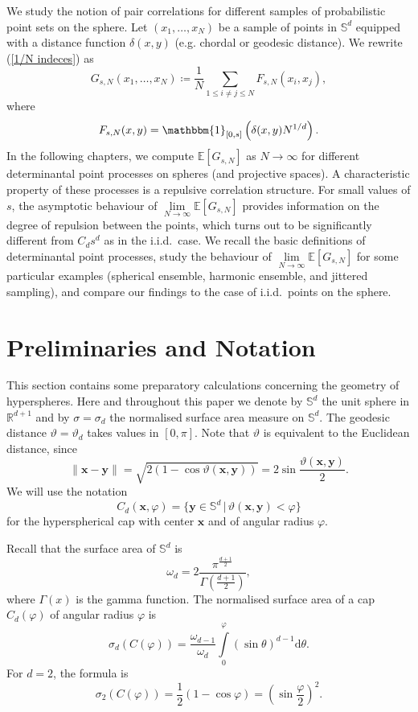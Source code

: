 \documentclass[a4paper,11pt]{amsart}
\begin{document}
We study the notion of pair correlations for different samples of probabilistic point sets on the sphere.  Let  $(x_1, \dots , x_N)$ be a sample of points in $\mathbb{S}^d$ equipped with a distance function $\delta(x,y)$ (e.g. chordal or geodesic distance). We rewrite (\ref{1/N indeces}) as
$$G_{s,N}(x_1,\dots,x_N)\coloneqq\frac{1}{N}\sum\limits_{1\leq i\neq j \leq N}F_{s,N}(x_i,x_j),$$
where 
$$F_{s,N}(x,y)=\mathbbm{1}_{[0,s]}\left(\delta(x,y)N^{1/d}\right).$$
In the following chapters, we compute  $\mathbb{E}\left[G_{s,N}\right]$ as $N\rightarrow\infty$ for different determinantal point processes on spheres (and projective spaces). A characteristic property of these processes is a repulsive correlation structure. For small values of $s$, the asymptotic behaviour of $\lim\limits_{N\rightarrow\infty}\mathbb{E}\left[G_{s,N}\right]$ provides information on the degree of repulsion between the points, which turns out to be significantly different from $C_ds^d$ as in the i.i.d.\ case. We recall the basic definitions of determinantal point processes, study the behaviour of $\lim\limits_{N\rightarrow\infty}\mathbb{E}\left[G_{s,N}\right]$ for some particular examples (spherical ensemble, harmonic ensemble, and jittered sampling), and compare our findings to the case of i.i.d.\ points on the sphere.






\section{Preliminaries and Notation}

This section contains some preparatory calculations concerning the geometry of hyperspheres. Here and throughout this paper we denote by $\mathbb{S}^d$ the unit sphere in $\mathbb{R}^{d+1}$ and by $\sigma =\sigma_d$ the normalised surface area measure on $\mathbb{S}^d$. The geodesic distance $\vartheta=\vartheta_d$ takes values in $[0,\pi]$. Note that $\vartheta$ is equivalent to the Euclidean distance, since
$$\|\mathbf{x}-\mathbf{y}\|=\sqrt{2(1-\cos\vartheta(\mathbf{x},\mathbf{y}))}=2\sin\frac{\vartheta(\mathbf{x},\mathbf{y})}{2}.$$ We will use the notation
$$C_d(\mathbf{x},\varphi)=\{\mathbf{y}\in\mathbb{S}^d\, |\, \vartheta(\mathbf{x},\mathbf{y})<\varphi\}$$
for the hyperspherical cap with center $\mathbf{x}$ and of angular radius $\varphi$. 

Recall that the surface area of $\mathbb{S}^d$ is $$\omega_d=2\frac{\pi^{\frac{d+1}{2}}}{\Gamma\left(\frac{d+1}{2}\right)},$$ 
where $\Gamma(x)$ is the gamma function. The normalised surface area of a cap $C_d(\varphi)$ of angular radius $\varphi$ is
$$\sigma_d(C(\varphi))=\frac{\omega_{d-1}}{\omega_d}\int\limits_{0}^\varphi(\sin\theta)^{d-1} \mathrm{d}\theta.$$ 
For $d=2$, the formula is 
$$\sigma_2(C(\varphi))=\frac{1}{2}(1-\cos\varphi)=\left(\sin\frac{\varphi}{2}\right)^2.$$
\end{document}
